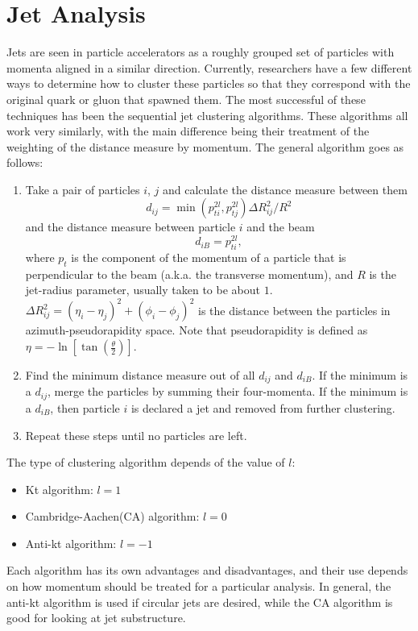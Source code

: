 \documentclass[a4paper,12pt]{report}
\begin{document}
\section{Jet Analysis}\label{sec:ja}
Jets are seen in particle accelerators as a roughly grouped set of particles with momenta aligned in a similar direction. Currently, researchers have a few different ways to determine how to cluster these particles so that they correspond with the original quark or gluon that spawned them. The most successful of these techniques has been the sequential jet clustering algorithms. These algorithms all work very similarly, with the main difference being their treatment of the weighting of the distance measure by momentum. The general algorithm goes as follows\cite{salam:2011}:
\begin{enumerate}
 \item Take a pair of particles $i$, $j$ and calculate the distance measure between them
 \[
  d_{ij} = \min(p_{ti}^{2l},p_{tj}^{2l})\Delta R_{ij}^2/R^2
 \]
 and the distance measure between particle $i$ and the beam
 \[
  d_{iB} = p_{ti}^{2l},
 \]
 where $p_{t}$ is the component of the momentum of a particle that is perpendicular to the beam (a.k.a. the transverse momentum), and $R$ is the jet-radius parameter, usually taken to be about $1$. $\Delta R_{ij}^2 = (\eta_i-\eta_j)^2 + (\phi_i-\phi_j)^2$ is the distance between the particles in azimuth-pseudorapidity space. Note that pseudorapidity is defined as $\eta = -\ln\left[\tan(\frac{\theta}{2})\right]$.
 \item Find the minimum distance measure out of all $d_{ij}$ and $d_{iB}$. If the minimum is a $d_{ij}$, merge the particles by summing their four-momenta. If the minimum is a $d_{iB}$, then particle $i$ is declared a jet and removed from further clustering.
 \item Repeat these steps until no particles are left.
\end{enumerate}

The type of clustering algorithm depends of the value of $l$:
\singlespacing
\begin{itemize}
 \item Kt algorithm: $l=1$
 \item Cambridge-Aachen(CA) algorithm: $l=0$
 \item Anti-kt algorithm: $l=-1$
\end{itemize}
\doublespacing
Each algorithm has its own advantages and disadvantages, and their use depends on how momentum should be treated for a particular analysis. In general, the anti-kt algorithm is used if circular jets are desired, while the CA algorithm is good for looking at jet substructure. 
\end{document}
